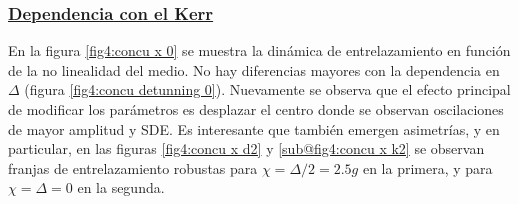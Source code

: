 \subsubsection{\underline{Dependencia con el Kerr}}
En la figura \ref{fig4:concu x 0} se muestra la dinámica de entrelazamiento en función de la no linealidad del medio. No hay diferencias mayores con la dependencia en $\Delta$ (figura \ref{fig4:concu detunning 0}). Nuevamente se observa que el efecto principal de modificar los parámetros es desplazar el centro donde se observan oscilaciones de mayor amplitud y SDE. Es interesante que también emergen asimetrías, y en particular, en las figuras \ref{fig4:concu x d2} y \ref{sub@fig4:concu x k2} se observan franjas de entrelazamiento robustas para $\chi=\Delta/2=2.5g$ en la primera, y para $\chi=\Delta=0$ en la segunda.

